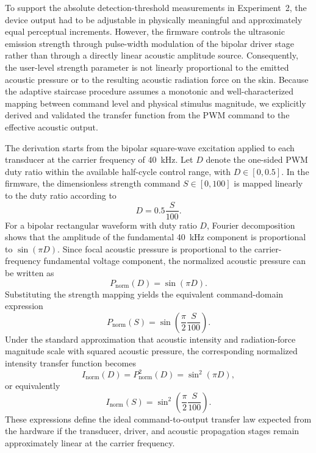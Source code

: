 \documentclass[pdflatex, sn-nature]{sn-jnl}
\theoremstyle{thmstyleone}%
\theoremstyle{thmstyletwo}%
\theoremstyle{thmstylethree}%
\begin{document}
To support the absolute detection-threshold measurements in Experiment~2, the device output had to be adjustable in physically meaningful and approximately equal perceptual increments. However, the firmware controls the ultrasonic emission strength through pulse-width modulation of the bipolar driver stage rather than through a directly linear acoustic amplitude source. Consequently, the user-level strength parameter is not linearly proportional to the emitted acoustic pressure or to the resulting acoustic radiation force on the skin. Because the adaptive staircase procedure assumes a monotonic and well-characterized mapping between command level and physical stimulus magnitude, we explicitly derived and validated the transfer function from the PWM command to the effective acoustic output.

The derivation starts from the bipolar square-wave excitation applied to each transducer at the carrier frequency of \qty{40}{\kilo\hertz}. Let $D$ denote the one-sided PWM duty ratio within the available half-cycle control range, with $D \in [0,0.5]$. In the firmware, the dimensionless strength command $S \in [0,100]$ is mapped linearly to the duty ratio according to
\begin{equation}
    D = 0.5\frac{S}{100}.
\end{equation}
For a bipolar rectangular waveform with duty ratio $D$, Fourier decomposition shows that the amplitude of the fundamental \qty{40}{\kilo\hertz} component is proportional to $\sin(\pi D)$. Since focal acoustic pressure is proportional to the carrier-frequency fundamental voltage component, the normalized acoustic pressure can be written as
\begin{equation}
    P_{\mathrm{norm}}(D) = \sin(\pi D).
\end{equation}
Substituting the strength mapping yields the equivalent command-domain expression
\begin{equation}
    P_{\mathrm{norm}}(S) = \sin\!\left(\frac{\pi}{2}\frac{S}{100}\right).
\end{equation}
Under the standard approximation that acoustic intensity and radiation-force magnitude scale with squared acoustic pressure, the corresponding normalized intensity transfer function becomes
\begin{equation}
    I_{\mathrm{norm}}(D) = P_{\mathrm{norm}}^2(D) = \sin^2(\pi D),
\end{equation}
or equivalently
\begin{equation}
    I_{\mathrm{norm}}(S) = \sin^2\!\left(\frac{\pi}{2}\frac{S}{100}\right).
\end{equation}
These expressions define the ideal command-to-output transfer law expected from the hardware if the transducer, driver, and acoustic propagation stages remain approximately linear at the carrier frequency.
\end{document}
